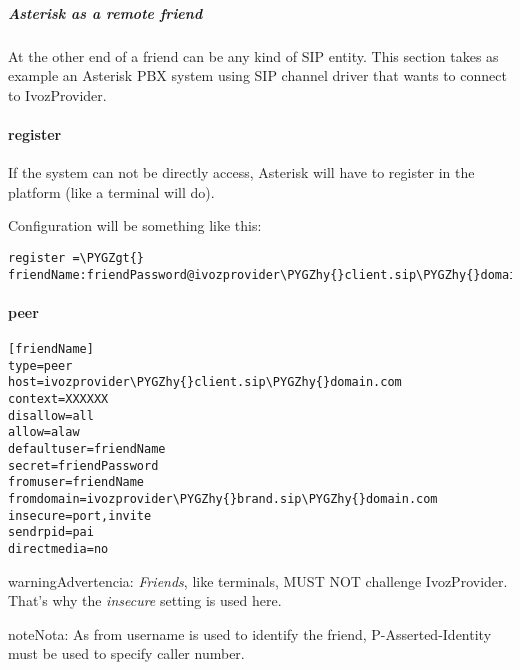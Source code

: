 \documentclass[letterpaper,10pt,spanish]{sphinxmanual}
\def\PYGZgt{\char`\>}
\def\PYGZhy{\char`\-}
\begin{document}
\subparagraph{Asterisk as a remote friend}
\label{administration_portal/client/vpbx/routing_endpoints/friends/remote_friends:asterisk-as-a-remote-friend}
At the other end of a friend can be any kind of SIP entity. This section takes
as example an Asterisk PBX system using SIP channel driver that wants to connect
to IvozProvider.
\paragraph{register}

If the system can not be directly access, Asterisk will have to register in the
platform (like a terminal will do).

Configuration will be something like this:

\begin{Verbatim}[commandchars=\\\{\}]
register =\PYGZgt{} friendName:friendPassword@ivozprovider\PYGZhy{}client.sip\PYGZhy{}domain.com
\end{Verbatim}
\paragraph{peer}

\begin{Verbatim}[commandchars=\\\{\}]
[friendName]
type=peer
host=ivozprovider\PYGZhy{}client.sip\PYGZhy{}domain.com
context=XXXXXX
disallow=all
allow=alaw
defaultuser=friendName
secret=friendPassword
fromuser=friendName
fromdomain=ivozprovider\PYGZhy{}brand.sip\PYGZhy{}domain.com
insecure=port,invite
sendrpid=pai
directmedia=no
\end{Verbatim}

\begin{notice}{warning}{Advertencia:}
\emph{Friends}, like terminals, MUST NOT challenge IvozProvider. That's
why the \emph{insecure} setting is used here.
\end{notice}

\begin{notice}{note}{Nota:}
As from username is used to identify the friend, P-Asserted-Identity must be used to specify caller number.
\end{notice}
\end{document}
